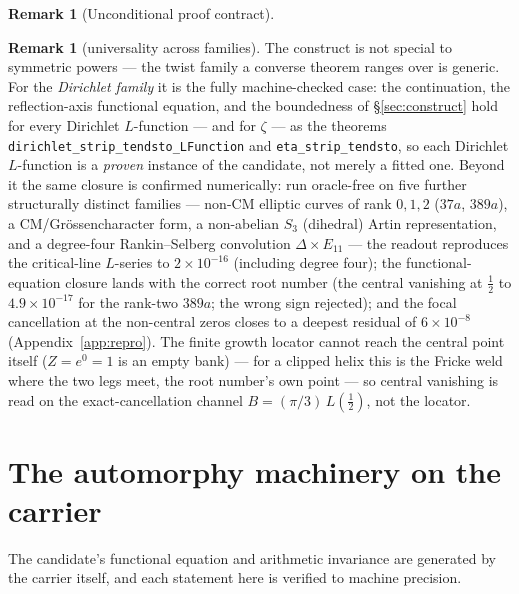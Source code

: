 \documentclass[11pt]{article}
\theoremstyle{definition}
\newtheorem{remark}[theorem]{Remark}
\begin{document}
\begin{remark}[Unconditional proof contract]
\begin{enumerate}
\begin{remark}[universality across families]
The construct is not special to symmetric powers --- the twist family a converse theorem ranges over
is generic. For the \emph{Dirichlet family} it is the fully machine-checked case: the continuation, the
reflection-axis functional equation, and the boundedness of \S\ref{sec:construct} hold for every
Dirichlet $L$-function --- and for $\zeta$ --- as the theorems \\
\texttt{dirichlet\_strip\_tendsto\_LFunction} and \texttt{eta\_strip\_tendsto}, so each Dirichlet
$L$-function is a \emph{proven} instance of the candidate, not merely a fitted one. Beyond it the same
closure is confirmed numerically: run oracle-free on five further structurally distinct families ---
non-CM elliptic curves of rank $0,1,2$ ($37a$, $389a$), a CM/Gr\"ossencharacter form, a non-abelian
$S_3$ (dihedral) Artin representation, and a degree-four Rankin--Selberg convolution
$\Delta\times E_{11}$ --- the readout reproduces the critical-line $L$-series to $2\times10^{-16}$
(including degree four); the functional-equation closure lands with the correct root number (the
central vanishing at $\tfrac12$ to $4.9\times10^{-17}$ for the rank-two $389a$; the wrong sign rejected);
and the focal cancellation at the non-central zeros closes to a deepest residual of
$6\times10^{-8}$ (Appendix~\ref{app:repro}). The finite growth
locator cannot reach the central point itself ($Z=e^{0}=1$ is an empty bank) --- for a clipped helix
this is the Fricke weld where the two legs meet, the root number's own point --- so central vanishing
is read on the exact-cancellation channel $B=(\pi/3)\,L(\tfrac12)$, not the locator.
\end{remark}

\section{The automorphy machinery on the carrier}\label{sec:machinery}

The candidate's functional equation and arithmetic invariance are generated by the carrier itself, and
each statement here is verified to machine precision.


\end{enumerate}
\end{remark}
\end{document}
